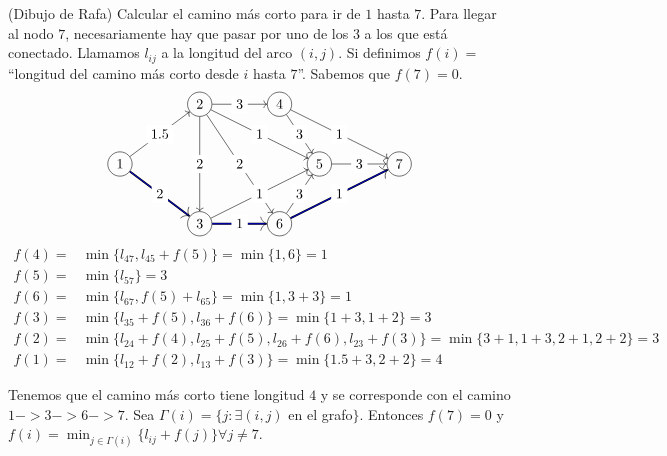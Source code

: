 \documentclass[MIOP.tex]{subfiles}
\begin{document}
\begin{ej}
(Dibujo de Rafa)
Calcular el camino más corto para ir de $1$ hasta $7$. Para llegar al nodo $7$, necesariamente hay que pasar por uno de los $3$ a los que está conectado. Llamamos $l_{ij}$ a la longitud del arco $(i,j)$. Si definimos $f(i)=$``longitud del camino más corto desde $i$ hasta $7$''. Sabemos que $f(7)=0$. 
\[
\begin{tikzpicture}
    \node[shape=circle,draw=black] (A) at (0,1.5) {$1$};
    \node[shape=circle,draw=black] (C) at (2,0) {$3$};    
    \node[shape=circle,draw=black] (B) at (2,3) {$2$};
    \node[shape=circle,draw=black] (D) at (4,3) {$4$};
    \node[shape=circle,draw=black] (E) at (4,0) {$6$};
    \node[shape=circle,draw=black] (F) at (5,1.5) {$5$};
    \node[shape=circle,draw=black] (G) at (7,1.5) {$7$};
\tikzset{mystyle/.style={->,double=blue}} 
\tikzset{every node/.style={fill=white}} 
     \path [->] (A) edge node {$1.5$} (B);
     \path [->] (A) edge [mystyle]  node {$2$} (C);
     \path [->] (B) edge node {$2$} (C);
     \path [->] (B) edge node {$1$} (F);
     \path [->] (B) edge node {$2$} (E);
     \path [->] (B) edge node {$3$} (D);
     \path [->] (C) edge [mystyle]  node {$1$} (E);
     \path [->] (C) edge node {$1$} (F);
     \path [->] (D) edge node {$3$} (F);
     \path [->] (D) edge node {$1$} (G);
     \path [->] (E) edge [mystyle] node {$1$} (G);
     \path [->] (F) edge node {$3$} (G);
	 \path [->] (E) edge node {$3$} (F);
\end{tikzpicture}
\]
\begin{align*}
f(4)=&\min\{l_{47},l_{45}+f(5)\}=\min\{1,6\}=1\\
f(5)=&\min\{l_{57}\}=3\\
f(6)=&\min\{l_{67},f(5)+l_{65}\}=\min\{1,3+3\}=1\\
f(3)=&\min\{l_{35}+f(5),l_{36}+f(6)\}=\min\{1+3,1+2\}=3\\
f(2)=&\min\{l_{24}+f(4),l_{25}+f(5),l_{26}+f(6),l_{23}+f(3)\}=\min\{3+1,1+3,2+1,2+2\}=3\\
f(1)=&\min\{l_{12}+f(2),l_{13}+f(3)\}=\min\{1.5+3,2+2\}=4
\end{align*}

Tenemos que el camino más corto tiene longitud $4$ y se corresponde con el camino $1->3->6->7$. Sea $\Gamma(i)=\{j:\exists (i,j)$ en el grafo$\}$. Entonces $f(7)=0$ y $f(i)=\min_{j\in\Gamma(i)}\{l_{ij}+f(j)\}\forall j\neq 7$.

\end{ej}
\end{document}
